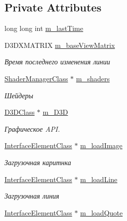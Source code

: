 \subsection*{Private Attributes}
\begin{DoxyCompactItemize}
\item 
long long int \hyperlink{class_load_screen_manager_class_a2df19deed774621d349d648df2afb82b}{m\+\_\+last\+Time}
\item 
D3\+D\+X\+M\+A\+T\+R\+IX \hyperlink{class_load_screen_manager_class_a1f055aef818211fb408d923764fc3ce8}{m\+\_\+base\+View\+Matrix}
\begin{DoxyCompactList}\small\item\em Время последнего изменения линии \end{DoxyCompactList}\item 
\hyperlink{class_shader_manager_class}{Shader\+Manager\+Class} $\ast$ \hyperlink{class_load_screen_manager_class_ad305583a33b79d2f1ad7e9551f8197c7}{m\+\_\+shaders}
\begin{DoxyCompactList}\small\item\em Шейдеры \end{DoxyCompactList}\item 
\hyperlink{class_d3_d_class}{D3\+D\+Class} $\ast$ \hyperlink{class_load_screen_manager_class_ab463e14a842826919d9d3a7ac40aff77}{m\+\_\+\+D3D}
\begin{DoxyCompactList}\small\item\em Графическое A\+PI. \end{DoxyCompactList}\item 
\hyperlink{class_interface_element_class}{Interface\+Element\+Class} $\ast$ \hyperlink{class_load_screen_manager_class_aa63f566996b69c84a6f3bbd58805d30b}{m\+\_\+load\+Image}
\begin{DoxyCompactList}\small\item\em Загрузочная каритнка \end{DoxyCompactList}\item 
\hyperlink{class_interface_element_class}{Interface\+Element\+Class} $\ast$ \hyperlink{class_load_screen_manager_class_addaf961c8dd9e240d029c1a5c5eb5e00}{m\+\_\+load\+Line}
\begin{DoxyCompactList}\small\item\em Загрузочная линия \end{DoxyCompactList}\item 
\hyperlink{class_interface_element_class}{Interface\+Element\+Class} $\ast$ \hyperlink{class_load_screen_manager_class_a073d951330dbf9a103f5d88536100948}{m\+\_\+load\+Quote}

\end{DoxyCompactItemize}
